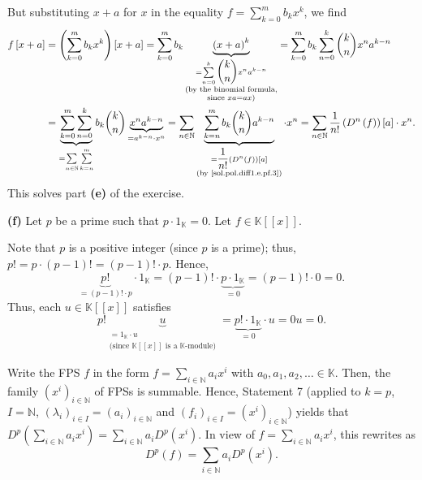 \documentclass[paper=a4, fontsize=12pt]{scrartcl}%
\let\sumnonlimits\sum
\renewcommand{\sum}{\sumnonlimits\limits}
\theoremstyle{plainsl}
\theoremstyle{definition}
\theoremstyle{remark}
\begin{document}
But substituting $x+a$ for $x$ in the equality $f=\sum_{k=0}^{m}b_{k}x^{k}$,
we find
\begin{align*}
f\left[  x+a\right]   &  =\left(  \sum_{k=0}^{m}b_{k}x^{k}\right)  \left[
x+a\right]  =\sum_{k=0}^{m}b_{k}\underbrace{\left(  x+a\right)  ^{k}%
}_{\substack{=\sum_{n=0}^{k}\dbinom{k}{n}x^{n}a^{k-n}\\\text{(by the binomial
formula,}\\\text{since }xa=ax\text{)}}}=\sum_{k=0}^{m}b_{k}\sum_{n=0}%
^{k}\dbinom{k}{n}x^{n}a^{k-n}\\
&  =\underbrace{\sum_{k=0}^{m}\sum_{n=0}^{k}}_{=\sum_{n\in\mathbb{N}}%
\sum_{k=n}^{m}}b_{k}\dbinom{k}{n}\underbrace{x^{n}a^{k-n}}_{=a^{k-n}\cdot
x^{n}}=\sum_{n\in\mathbb{N}}\underbrace{\sum_{k=n}^{m}b_{k}\dbinom{k}%
{n}a^{k-n}}_{\substack{=\dfrac{1}{n!}\left(  D^{n}\left(  f\right)  \right)
\left[  a\right]  \\\text{(by \eqref{sol.pol.diff1.e.pf.3})}}}\cdot x^{n}%
=\sum_{n\in\mathbb{N}}\dfrac{1}{n!}\left(  D^{n}\left(  f\right)  \right)
\left[  a\right]  \cdot x^{n}.
\end{align*}
This solves part \textbf{(e)} of the exercise.

\bigskip

\textbf{(f)} Let $p$ be a prime such that $p\cdot1_{\mathbb{K}}=0$. Let
$f\in\mathbb{K}\left[  \left[  x\right]  \right]  $.

Note that $p$ is a positive integer (since $p$ is a prime); thus,
$p!=p\cdot\left(  p-1\right)  !=\left(  p-1\right)  !\cdot p$. Hence,
\[
\underbrace{p!}_{=\left(  p-1\right)  !\cdot p}\cdot1_{\mathbb{K}}=\left(
p-1\right)  !\cdot\underbrace{p\cdot1_{\mathbb{K}}}_{=0}=\left(  p-1\right)
!\cdot0=0.
\]
Thus, each $u\in\mathbb{K}\left[  \left[  x\right]  \right]  $ satisfies%
\begin{equation}
p!\underbrace{u}_{\substack{=1_{\mathbb{K}}\cdot u\\\text{(since }%
\mathbb{K}\left[  \left[  x\right]  \right]  \text{ is a }\mathbb{K}%
\text{-module)}}}=\underbrace{p!\cdot1_{\mathbb{K}}}_{=0}\cdot u=0u=0.
\label{sol.pol.diff1.f.pf.0gen}%
\end{equation}


Write the FPS $f$ in the form $f=\sum_{i\in\mathbb{N}}a_{i}x^{i}$ with
$a_{0},a_{1},a_{2},\ldots\in\mathbb{K}$. Then, the family $\left(
x^{i}\right)  _{i\in\mathbb{N}}$ of FPSs is summable. Hence, Statement 7
(applied to $k=p$, $I=\mathbb{N}$, $\left(  \lambda_{i}\right)  _{i\in
I}=\left(  a_{i}\right)  _{i\in\mathbb{N}}$ and $\left(  f_{i}\right)  _{i\in
I}=\left(  x^{i}\right)  _{i\in\mathbb{N}}$) yields that $D^{p}\left(
\sum_{i\in\mathbb{N}}a_{i}x^{i}\right)  =\sum_{i\in\mathbb{N}}a_{i}%
D^{p}\left(  x^{i}\right)  $. In view of $f=\sum_{i\in\mathbb{N}}a_{i}x^{i}$,
this rewrites as
\begin{equation}
D^{p}\left(  f\right)  =\sum_{i\in\mathbb{N}}a_{i}D^{p}\left(  x^{i}\right)  .
\label{sol.pol.diff1.f.pf.1}%
\end{equation}
\end{document}
